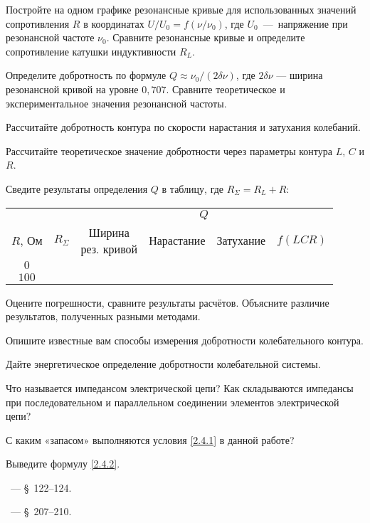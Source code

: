 \begin{lab:task}

	\item Постройте на одном графике резонансные кривые для использованных значений
    сопротивления $R$ в координатах $U/U_0 = f(\nu/\nu_0)$, 
    где $U_0$~---~напряжение при резонансной частоте $\nu_0$.
    Сравните резонансные кривые и определите сопротивление катушки индуктивности
    $R_L$.
    \item Определите добротность по формуле $Q \approx \nu_0/(2\delta\nu)$,
    где $2\delta \nu$ --- ширина резонансной кривой на уровне $0,707$.
    Сравните теоретическое и экспериментальное значения резонансной частоты.

	\item Рассчитайте добротность контура по скорости нарастания и затухания
колебаний.

	\item Рассчитайте теоретическое значение добротности через параметры
контура $L$, $C$ и $R$.

\item Сведите результаты определения $Q$ в таблицу, где $R_{\Sigma}=R_L+R$:
\begin{center}\small
\begin{tabular}{|c|c|c|c|c|c|}
\hline
& & \multicolumn{4}{c|}{$Q$}\\
\cline{3-6}
$R$, Ом & $R_{\Sigma}$ & 
\parbox{2cm}{Ширина\\[-4pt] рез. кривой} & Нарастание & Затухание &$f(LCR)$\\
\hline
$0$ & & & & & \\
$100$ & & & & &\\
\hline
\end{tabular}
\end{center}
%
	\item Оцените погрешности, сравните результаты расчётов. Объясните
    различие результатов, полученных разными методами.
\end{lab:task}


\begin{lab:questions}
    \item Опишите известные вам способы измерения добротности колебательного контура.
    \item Дайте энергетическое определение добротности колебательной системы.
    \item Что называется импедансом электрической цепи?
        Как складываются импедансы при последовательном и параллельном
        соединении элементов электрической цепи?
    \item С каким «запасом» выполняются условия \eqref{2.4.1} в данной работе?
    \item Выведите формулу \eqref{2.4.2}.
\end{lab:questions}


\begin{lab:literature}
	\item \SivuhinIII~--- \S~122--124.

	\item \Kalashnikov~--- \S~207--210.
\end{lab:literature}
